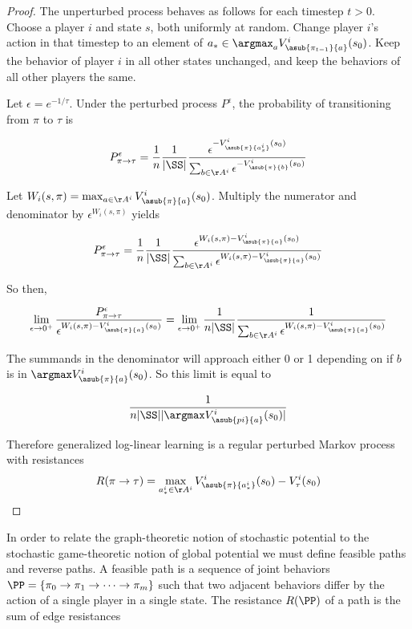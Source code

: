 \begin{proof}
The unperturbed process behaves as follows for each timestep $t > 0$. Choose a player $i$ and state $s$, both uniformly at random. Change player $i$'s action in that timestep to an element of $a_* \in \argmax_a {V^i_{\asub{\pi_{t-1}}{a}}(s_0)}$. Keep the behavior of player $i$ in all other states unchanged, and keep the behaviors of all other players the same.

Let $\epsilon = e^{-1/\tau}$. Under the perturbed process $P^{\epsilon}$, the probability of transitioning from $\pi$ to $\tau$ is

$$
P^{\epsilon}_{\pi \rightarrow \tau} = \dfrac{1}{n} \dfrac{1}{|\SS|} \dfrac{\epsilon^{-V^i_{\asub{\pi}{a^i_s}}(s_0)}}{\sum_{b \in \AA^i} \epsilon^{-V^i_{\asub{\pi}{b}}(s_0)}}
$$

Let $W_i(s, \pi) = \max_{a \in \AA^i} V^i_{\asub{\pi}{a}}(s_0)$. Multiply the numerator and denominator by $\epsilon^{W_i(s, \pi)}$ yields

$$
P^{\epsilon}_{\pi \rightarrow \tau} = \dfrac{1}{n} \dfrac{1}{|\SS|} \dfrac{\epsilon^{W_i(s, \pi)-V^i_{\asub{\pi}{a}}(s_0)}}{\sum_{b \in \AA^i} \epsilon^{W_i(s, \pi)-V^i_{\asub{\pi}{a}}(s_0)}}
$$

So then,

$$
\lim_{\epsilon \rightarrow 0^+} \dfrac{P^{\epsilon}_{\pi \rightarrow \tau}}{\epsilon^{W_i(s, \pi)-V^i_{\asub{\pi}{a}}(s_0)}} \\
= \lim_{\epsilon \rightarrow 0^+} \dfrac{1}{n |\SS|} \dfrac{1}{\sum_{b \in \AA^i} \epsilon^{W_i(s, \pi)-V^i_{\asub{\pi}{a}}(s_0)}}
$$

The summands in the denominator will approach either 0 or 1 depending on if $b$ is in $\argmax V^i_{\asub{\pi}{a}}(s_0)$. So this limit is equal to

$$
\dfrac{1}{n |\SS| |\argmax V^i_{\asub{pi}{a}}(s_0)|}
$$

Therefore generalized log-linear learning is a regular perturbed Markov process with resistances
$$
R(\pi \rightarrow \tau) = \max_{a^i_* \in \AA^i} V^i_{\asub{\pi}{a^i_*}}(s_0) - V^i_{\tau}(s_0)
$$
\end{proof}

In order to relate the graph-theoretic notion of stochastic potential to the stochastic game-theoretic notion of global potential we must define feasible paths and reverse paths. A feasible path is a sequence of joint behaviors $\PP = \{\pi_0 \rightarrow \pi_1 \rightarrow \cdots \rightarrow \pi_m\}$ such that two adjacent behaviors differ by the action of a single player in a single state. The resistance $R(\PP)$ of a path is the sum of edge resistances

